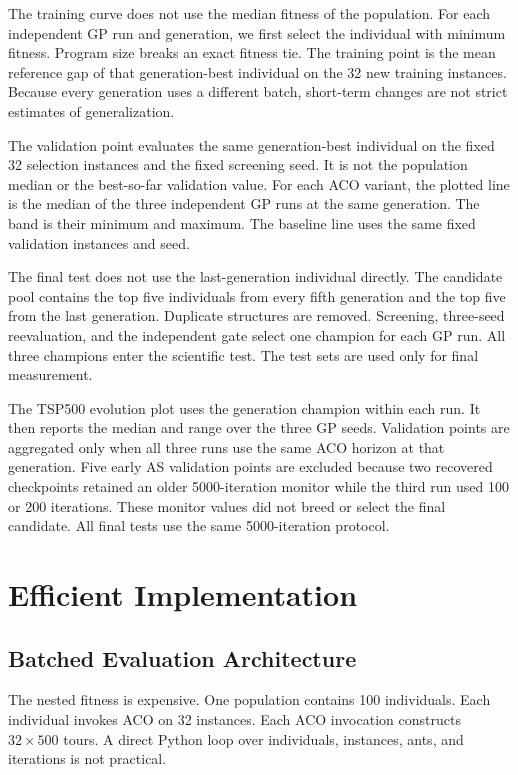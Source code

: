 \documentclass[letterpaper,journal]{IEEEtran}
\begin{document}
The training curve does not use the median fitness of the population.
For each independent GP run and generation, we first select the individual
with minimum fitness.
Program size breaks an exact fitness tie.
The training point is the mean reference gap of that generation-best
individual on the 32 new training instances.
Because every generation uses a different batch, short-term changes are not
strict estimates of generalization.

The validation point evaluates the same generation-best individual on the
fixed 32 selection instances and the fixed screening seed.
It is not the population median or the best-so-far validation value.
For each ACO variant, the plotted line is the median of the three independent
GP runs at the same generation.
The band is their minimum and maximum.
The baseline line uses the same fixed validation instances and seed.

The final test does not use the last-generation individual directly.
The candidate pool contains the top five individuals from every fifth
generation and the top five from the last generation.
Duplicate structures are removed.
Screening, three-seed reevaluation, and the independent gate select one
champion for each GP run.
All three champions enter the scientific test.
The test sets are used only for final measurement.

The TSP500 evolution plot uses the generation champion within each run.
It then reports the median and range over the three GP seeds.
Validation points are aggregated only when all three runs use the same ACO
horizon at that generation.
Five early AS validation points are excluded because two recovered
checkpoints retained an older 5000-iteration monitor while the third run used
100 or 200 iterations.
These monitor values did not breed or select the final candidate.
All final tests use the same 5000-iteration protocol.

\section{Efficient Implementation}

\subsection{Batched Evaluation Architecture}

The nested fitness is expensive.
One population contains 100 individuals.
Each individual invokes ACO on 32 instances.
Each ACO invocation constructs \(32\times500\) tours.
A direct Python loop over individuals, instances, ants, and iterations is not practical.
\end{document}
